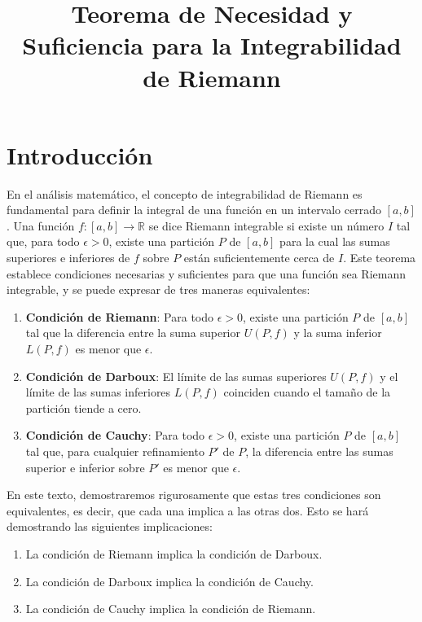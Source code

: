 \documentclass{article}
\title{Teorema de Necesidad y Suficiencia para la Integrabilidad de Riemann}
\author{}
\date{}
\begin{document}
\maketitle

\section*{Introducción}
En el análisis matemático, el concepto de integrabilidad de Riemann es fundamental para definir la integral de una función en un intervalo cerrado $[a, b]$. Una función $f: [a, b] \to \mathbb{R}$ se dice Riemann integrable si existe un número $I$ tal que, para todo $\epsilon > 0$, existe una partición $P$ de $[a, b]$ para la cual las sumas superiores e inferiores de $f$ sobre $P$ están suficientemente cerca de $I$. Este teorema establece condiciones necesarias y suficientes para que una función sea Riemann integrable, y se puede expresar de tres maneras equivalentes:

\begin{enumerate}
    \item \textbf{Condición de Riemann}: Para todo $\epsilon > 0$, existe una partición $P$ de $[a, b]$ tal que la diferencia entre la suma superior $U(P, f)$ y la suma inferior $L(P, f)$ es menor que $\epsilon$.
    
    \item \textbf{Condición de Darboux}: El límite de las sumas superiores $U(P, f)$ y el límite de las sumas inferiores $L(P, f)$ coinciden cuando el tamaño de la partición tiende a cero.
    
    \item \textbf{Condición de Cauchy}: Para todo $\epsilon > 0$, existe una partición $P$ de $[a, b]$ tal que, para cualquier refinamiento $P'$ de $P$, la diferencia entre las sumas superior e inferior sobre $P'$ es menor que $\epsilon$.
\end{enumerate}

En este texto, demostraremos rigurosamente que estas tres condiciones son equivalentes, es decir, que cada una implica a las otras dos. Esto se hará demostrando las siguientes implicaciones:

\begin{enumerate}
    \item La condición de Riemann implica la condición de Darboux.
    \item La condición de Darboux implica la condición de Cauchy.
    \item La condición de Cauchy implica la condición de Riemann.
\end{enumerate}
\end{document}
